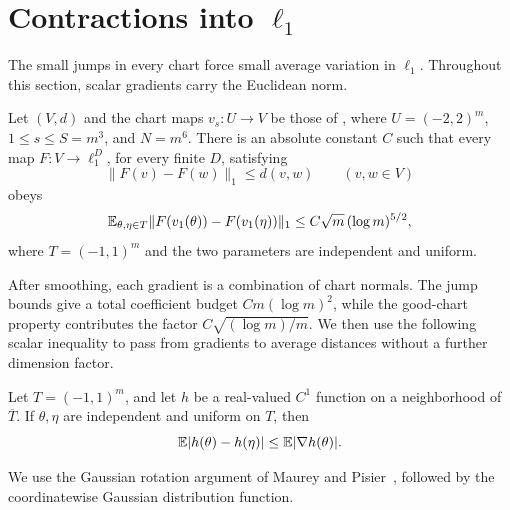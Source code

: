 \section{Contractions into \texorpdfstring{$\ell_1$}{ell1}}
\label{sec:contraction}

The small jumps in every chart force small average variation in $\ell_1$.
Throughout this section, scalar gradients carry the Euclidean norm.

\begin{proposition}
\label{prop:contraction}
Let $(V,d)$ and the chart maps $v_s:U\to V$ be those of
, where $U=(-2,2)^m$, $1\le s\le S=m^3$, and
$N=m^6$. There is an absolute constant $C$ such that every map
$F:V\to\ell_1^D$, for every finite $D$, satisfying
\[
  \|F(v)-F(w)\|_1\le d(v,w)\qquad(v,w\in V)
\]
obeys
\begin{equation}
  \mathbb E_{\theta,\eta\in T}
  \|F(v_1(\theta))-F(v_1(\eta))\|_1
  \le C\sqrt m\,(\log m)^{5/2},
  \label{con:eq:contraction}
\end{equation}
where $T=(-1,1)^m$ and the two parameters are independent and uniform.
\end{proposition}

After smoothing, each gradient is a combination of chart normals. The
jump bounds give a total coefficient budget $Cm(\log m)^2$, while the
good-chart property contributes the factor $C\sqrt{(\log m)/m}$.
We then use the following scalar inequality to pass from gradients to
average distances without a further dimension factor.

\begin{lemma}
\label{con:lem:cube}
Let $T=(-1,1)^m$, and let $h$ be a real-valued $C^1$ function on a
neighborhood of $\overline T$. If $\theta,\eta$ are independent and uniform
on $T$, then
\begin{equation}
  \mathbb E|h(\theta)-h(\eta)|
  \le \mathbb E|\nabla h(\theta)|.
  \label{con:eq:cube}
\end{equation}
\end{lemma}

We use the Gaussian rotation argument of Maurey and Pisier~\cite{Pis86},
followed by the coordinatewise Gaussian distribution function.

